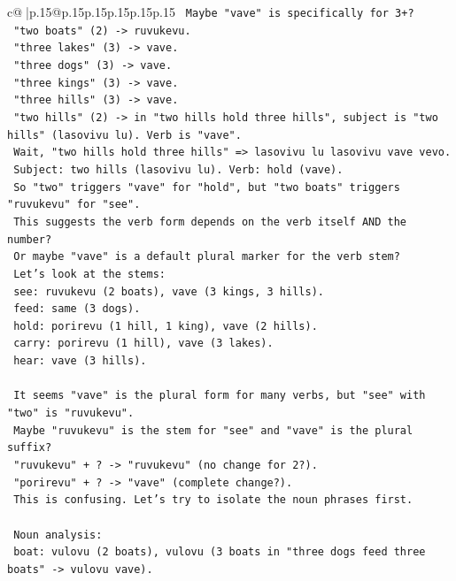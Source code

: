 \documentclass{article}
\begin{document}
{\begin{supertabular}{c@{$\;$}|p{.15\linewidth}@{}p{.15\linewidth}p{.15\linewidth}p{.15\linewidth}p{.15\linewidth}p{.15\linewidth}}
{{{\texttt{   Maybe "vave" is specifically for 3+?} \\
\texttt{   "two boats" (2) {-}> ruvukevu.} \\
\texttt{   "three lakes" (3) {-}> vave.} \\
\texttt{   "three dogs" (3) {-}> vave.} \\
\texttt{   "three kings" (3) {-}> vave.} \\
\texttt{   "three hills" (3) {-}> vave.} \\
\texttt{   "two hills" (2) {-}> in "two hills hold three hills", subject is "two hills" (lasovivu lu). Verb is "vave".} \\
\texttt{   Wait, "two hills hold three hills" => lasovivu lu lasovivu vave vevo.} \\
\texttt{   Subject: two hills (lasovivu lu). Verb: hold (vave).} \\
\texttt{   So "two" triggers "vave" for "hold", but "two boats" triggers "ruvukevu" for "see".} \\
\texttt{   This suggests the verb form depends on the verb itself AND the number?} \\
\texttt{   Or maybe "vave" is a default plural marker for the verb stem?} \\
\texttt{   Let's look at the stems:} \\
\texttt{   see: ruvukevu (2 boats), vave (3 kings, 3 hills).} \\
\texttt{   feed: same (3 dogs).} \\
\texttt{   hold: porirevu (1 hill, 1 king), vave (2 hills).} \\
\texttt{   carry: porirevu (1 hill), vave (3 lakes).} \\
\texttt{   hear: vave (3 hills).} \\
\\ 
\texttt{   It seems "vave" is the plural form for many verbs, but "see" with "two" is "ruvukevu".} \\
\texttt{   Maybe "ruvukevu" is the stem for "see" and "vave" is the plural suffix?} \\
\texttt{   "ruvukevu" + ? {-}> "ruvukevu" (no change for 2?).} \\
\texttt{   "porirevu" + ? {-}> "vave" (complete change?).} \\
\texttt{   This is confusing. Let's try to isolate the noun phrases first.} \\
\\ 
\texttt{   Noun analysis:} \\
\texttt{   boat: vulovu (2 boats), vulovu (3 boats in "three dogs feed three boats" {-}> vulovu vave).} \\
}}}
\end{supertabular}}
\end{document}
